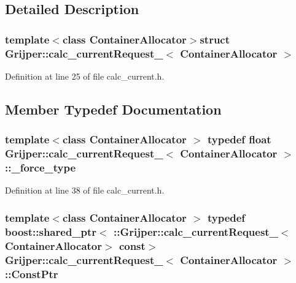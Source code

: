 \subsection{Detailed Description}
\subsubsection*{template$<$class Container\-Allocator$>$struct Grijper\-::calc\-\_\-current\-Request\-\_\-$<$ Container\-Allocator $>$}



Definition at line 25 of file calc\-\_\-current.\-h.



\subsection{Member Typedef Documentation}
\subsubsection[{\-\_\-force\-\_\-type}]{\setlength{\rightskip}{0pt plus 5cm}template$<$class Container\-Allocator $>$ typedef float {\bf Grijper\-::calc\-\_\-current\-Request\-\_\-}$<$ Container\-Allocator $>$\-::{\bf \-\_\-force\-\_\-type}}\label{structGrijper_1_1calc__currentRequest___af25f1423793abae37a54b987d93c931a}


Definition at line 38 of file calc\-\_\-current.\-h.

\subsubsection[{Const\-Ptr}]{\setlength{\rightskip}{0pt plus 5cm}template$<$class Container\-Allocator $>$ typedef boost\-::shared\-\_\-ptr$<$ \-::{\bf Grijper\-::calc\-\_\-current\-Request\-\_\-}$<$Container\-Allocator$>$ const$>$ {\bf Grijper\-::calc\-\_\-current\-Request\-\_\-}$<$ Container\-Allocator $>$\-::{\bf Const\-Ptr}}\label{structGrijper_1_1calc__currentRequest___ae017292b3a14b46c258a396777ab82d2}


